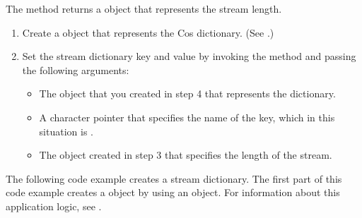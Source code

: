 \documentclass[letterpaper,12pt,english,openany,oneside]{sphinxmanual}
\begin{document}
The  method returns a  object that represents the stream length.
\begin{enumerate}
%
\item {} 
Create a  object that represents the Cos dictionary. (See .)

\item {} 
Set the stream dictionary key and value by invoking the  method and passing the following arguments:
\begin{itemize}
\item {} 
The  object that you created in step 4 that represents the dictionary.

\item {} 
A character pointer that specifies the name of the key, which in this situation is .

\item {} 
The  object created in step 3 that specifies the length of the stream.

\end{itemize}

\end{enumerate}

The following code example creates a stream dictionary. The first part of this code example creates a  object by using an  object. For information about this application logic, see .
\end{document}
